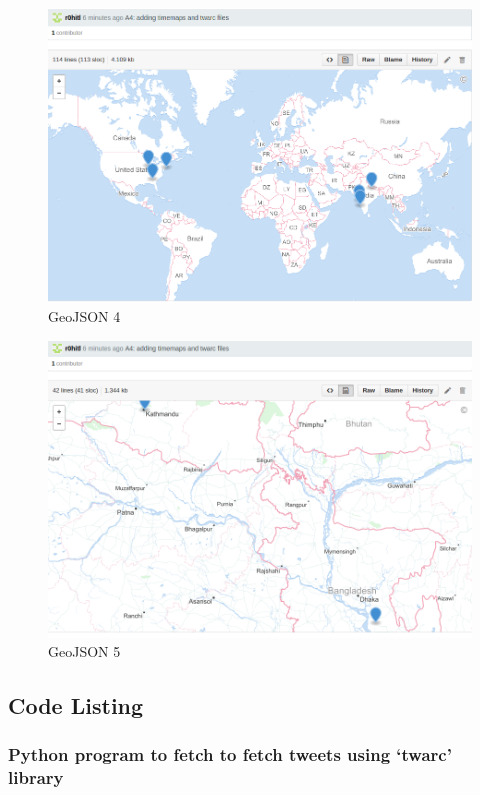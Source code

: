 \begin{enumerate}
\newpage
\begin{figure}[ht]    
    \begin{center}
        \includegraphics[scale=0.40]{graphs/gj4.png}
        \caption{GeoJSON 4}
    \end{center}
\end{figure}

\newpage
\begin{figure}[ht]    
    \begin{center}
        \includegraphics[scale=0.40]{graphs/gj5.png}
        \caption{GeoJSON 5}
    \end{center}
\end{figure}

\newpage
\subsection{Code Listing}
\subsubsection{Python program to fetch to fetch tweets using `twarc' library}

\newpage

\end{enumerate}